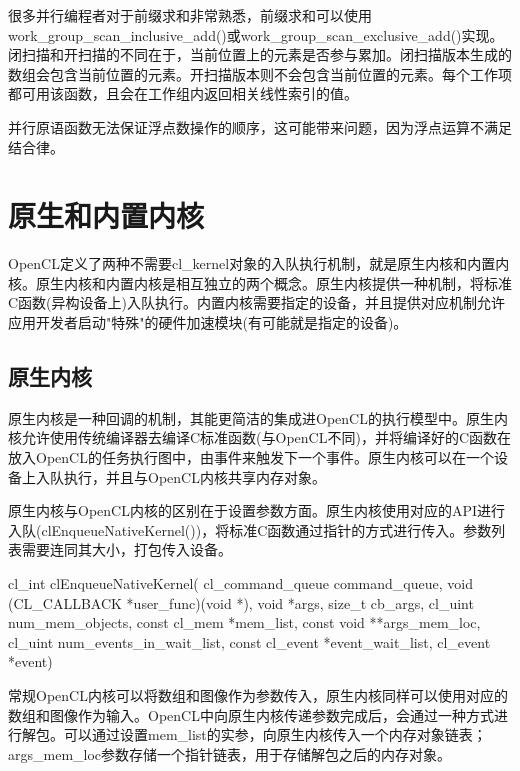 很多并行编程者对于前缀求和非常熟悉，前缀求和可以使用work\_\allowbreak{}group\_\allowbreak{}scan\_\allowbreak{}inclusive\_\allowbreak{}add()或work\_\allowbreak{}group\_\allowbreak{}scan\_\allowbreak{}exclusive\_\allowbreak{}add()实现。闭扫描和开扫描的不同在于，当前位置上的元素是否参与累加。闭扫描版本生成的数组会包含当前位置的元素。开扫描版本则不会包含当前位置的元素。每个工作项都可用该函数，且会在工作组内返回相关线性索引的值。

并行原语函数无法保证浮点数操作的顺序，这可能带来问题，因为浮点运算不满足结合律。



\section{原生和内置内核}

OpenCL定义了两种不需要cl\_\allowbreak{}kernel对象的入队执行机制，就是原生内核和内置内核。原生内核和内置内核是相互独立的两个概念。原生内核提供一种机制，将标准C函数(异构设备上)入队执行。内置内核需要指定的设备，并且提供对应机制允许应用开发者启动"特殊"的硬件加速模块(有可能就是指定的设备)。

\subsection{原生内核}

原生内核是一种回调的机制，其能更简洁的集成进OpenCL的执行模型中。原生内核允许使用传统编译器去编译C标准函数(与OpenCL不同)，并将编译好的C函数在放入OpenCL的任务执行图中，由事件来触发下一个事件。原生内核可以在一个设备上入队执行，并且与OpenCL内核共享内存对象。

原生内核与OpenCL内核的区别在于设置参数方面。原生内核使用对应的API进行入队(clEnqueueNativeKernel())，将标准C函数通过指针的方式进行传入。参数列表需要连同其大小，打包传入设备。

\begin{codebox}[cpp]
cl_int
clEnqueueNativeKernel(
  cl_command_queue command_queue,
  void (CL_CALLBACK *user_func)(void *),
  void *args,
  size_t cb_args,
  cl_uint num_mem_objects,
  const cl_mem *mem_list,
  const void **args_mem_loc,
  cl_uint num_events_in_wait_list,
  const cl_event *event_wait_list,
  cl_event *event)
\end{codebox}

常规OpenCL内核可以将数组和图像作为参数传入，原生内核同样可以使用对应的数组和图像作为输入。OpenCL中向原生内核传递参数完成后，会通过一种方式进行解包。可以通过设置mem\_\allowbreak{}list的实参，向原生内核传入一个内存对象链表；args\_\allowbreak{}mem\_\allowbreak{}loc参数存储一个指针链表，用于存储解包之后的内存对象。

